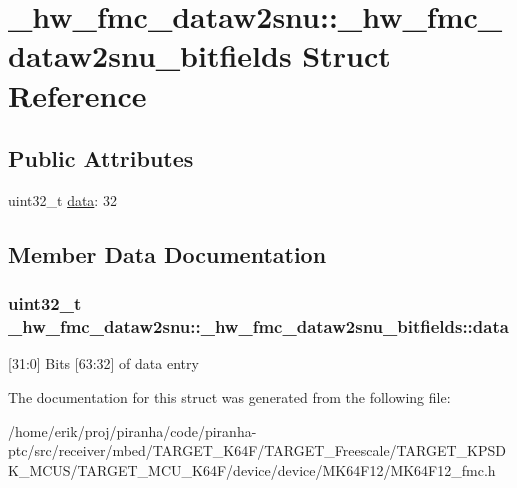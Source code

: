 \hypertarget{struct__hw__fmc__dataw2snu_1_1__hw__fmc__dataw2snu__bitfields}{}\section{\+\_\+hw\+\_\+fmc\+\_\+dataw2snu\+:\+:\+\_\+hw\+\_\+fmc\+\_\+dataw2snu\+\_\+bitfields Struct Reference}
\label{struct__hw__fmc__dataw2snu_1_1__hw__fmc__dataw2snu__bitfields}
\subsection*{Public Attributes}
\begin{DoxyCompactItemize}
\item 
uint32\+\_\+t \hyperlink{struct__hw__fmc__dataw2snu_1_1__hw__fmc__dataw2snu__bitfields_abe8e348c3cd958bb3731178ef6ebb346}{data}\+: 32
\end{DoxyCompactItemize}


\subsection{Member Data Documentation}
\subsubsection[{\texorpdfstring{data}{data}}]{\setlength{\rightskip}{0pt plus 5cm}uint32\+\_\+t \+\_\+hw\+\_\+fmc\+\_\+dataw2snu\+::\+\_\+hw\+\_\+fmc\+\_\+dataw2snu\+\_\+bitfields\+::data}\hypertarget{struct__hw__fmc__dataw2snu_1_1__hw__fmc__dataw2snu__bitfields_abe8e348c3cd958bb3731178ef6ebb346}{}\label{struct__hw__fmc__dataw2snu_1_1__hw__fmc__dataw2snu__bitfields_abe8e348c3cd958bb3731178ef6ebb346}
\mbox{[}31\+:0\mbox{]} Bits \mbox{[}63\+:32\mbox{]} of data entry 

The documentation for this struct was generated from the following file\+:\begin{DoxyCompactItemize}
\item 
/home/erik/proj/piranha/code/piranha-\/ptc/src/receiver/mbed/\+T\+A\+R\+G\+E\+T\+\_\+\+K64\+F/\+T\+A\+R\+G\+E\+T\+\_\+\+Freescale/\+T\+A\+R\+G\+E\+T\+\_\+\+K\+P\+S\+D\+K\+\_\+\+M\+C\+U\+S/\+T\+A\+R\+G\+E\+T\+\_\+\+M\+C\+U\+\_\+\+K64\+F/device/device/\+M\+K64\+F12/M\+K64\+F12\+\_\+fmc.\+h\end{DoxyCompactItemize}
